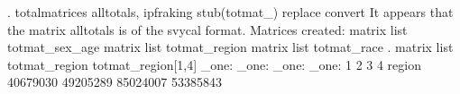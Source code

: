 . totalmatrices alltotals, ipfraking stub(totmat_) replace convert
It appears that the matrix alltotals is of the svycal format.
Matrices created:
matrix list totmat_sex_age
matrix list totmat_region
matrix list totmat_race
{\smallskip}
. matrix list totmat_region
{\smallskip}
totmat_region[1,4]
            _one:     _one:     _one:     _one:
               1         2         3         4
region  40679030  49205289  85024007  53385843
{\smallskip}
